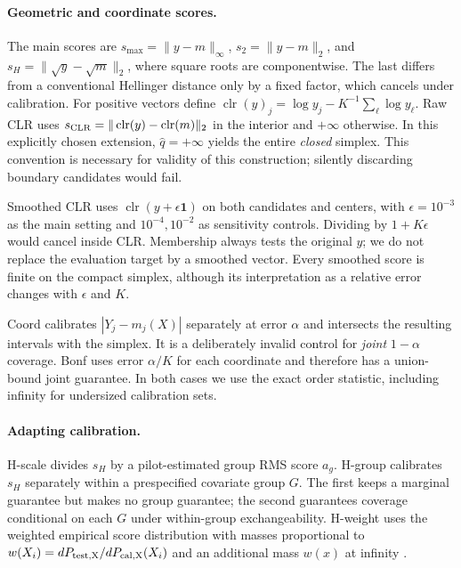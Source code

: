 \documentclass{article}
\newcommand{\clr}{\operatorname{clr}}
\begin{document}
\paragraph{Geometric and coordinate scores.}
The main scores are $s_{\max}=\|y-m\|_\infty$, $s_2=\|y-m\|_2$, and $s_H=\|\sqrt y-\sqrt m\|_2$, where square roots are componentwise. The last differs from a conventional Hellinger distance only by a fixed factor, which cancels under calibration. For positive vectors define $\clr(y)_j=\log y_j-K^{-1}\sum_\ell\log y_\ell$. Raw CLR uses $s_{\rm CLR}=\|\clr(y)-\clr(m)\|_2$ in the interior and $+\infty$ otherwise. In this explicitly chosen extension, $\widehat q=+\infty$ yields the entire \emph{closed} simplex. This convention is necessary for validity of this construction; silently discarding boundary candidates would fail.

Smoothed CLR uses $\clr(y+\epsilon\boldsymbol1)$ on both candidates and centers, with $\epsilon=10^{-3}$ as the main setting and $10^{-4},10^{-2}$ as sensitivity controls. Dividing by $1+K\epsilon$ would cancel inside CLR. Membership always tests the original $y$; we do not replace the evaluation target by a smoothed vector. Every smoothed score is finite on the compact simplex, although its interpretation as a relative error changes with $\epsilon$ and $K$.

Coord calibrates $|Y_j-m_j(X)|$ separately at error $\alpha$ and intersects the resulting intervals with the simplex. It is a deliberately invalid control for \emph{joint} $1-\alpha$ coverage. Bonf uses error $\alpha/K$ for each coordinate and therefore has a union-bound joint guarantee. In both cases we use the exact order statistic, including infinity for undersized calibration sets.

\paragraph{Adapting calibration.}
H-scale divides $s_H$ by a pilot-estimated group RMS score $a_g$. H-group calibrates $s_H$ separately within a prespecified covariate group $G$. The first keeps a marginal guarantee but makes no group guarantee; the second guarantees coverage conditional on each $G$ under within-group exchangeability. H-weight uses the weighted empirical score distribution with masses proportional to $w(X_i)=dP_{\rm test,X}/dP_{\rm cal,X}(X_i)$ and an additional mass $w(x)$ at infinity \citep{tibshirani2019}.
\end{document}
